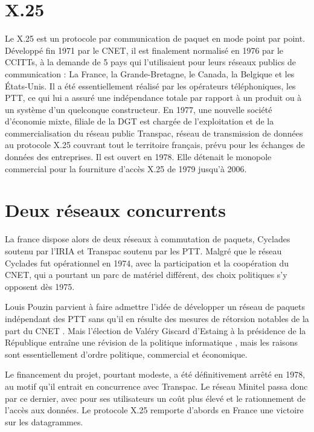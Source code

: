 \documentclass[12pt]{report}
\begin{document}
\section{X.25}

Le X.25 est un protocole par communication de paquet en mode point par point\cite{wikix25}. Développé fin 1971 par le \gls{CNET}, il est finalement normalisé en 1976 par le \glspl{CCITT}, à la demande de 5 pays qui l'utilisaient pour leurs réseaux publics de communication : La France, la Grande-Bretagne, le Canada, la Belgique et les États-Unis. Il a été essentiellement réalisé par les opérateurs téléphoniques, les \gls{PTT}, ce qui lui a assuré une indépendance totale par rapport à un produit ou à un système d'un quelconque constructeur. En 1977, une nouvelle société d'économie mixte, filiale de la DGT est chargée de l'exploitation et de la commercialisation du réseau public Transpac, réseau de transmission de données au protocole X.25 couvrant tout le territoire français, prévu pour les échanges de données des entreprises. Il est ouvert en 1978. Elle détenait le monopole commercial pour la fourniture d'accès X.25 de 1979 jusqu'à 2006\cite{wikitranspac}.

\section{Deux réseaux concurrents}

La france dispose alors de deux réseaux à commutation de paquets, Cyclades soutenu par l'IRIA et Transpac soutenu par les PTT. Malgré que le réseau Cyclades fut opérationnel en 1974, avec la participation et la coopération du CNET, qui a pourtant un parc de matériel différent, des choix politiques s'y opposent dès 1975.

Louis Pouzin parvient à faire admettre l'idée de développer un réseau de paquets indépendant des PTT \og sans qu'il en résulte des mesures de rétorsion notables de la part du CNET \fg. Mais l'élection de Valéry Giscard d'Estaing à la présidence de la République entraîne \og une révision de la politique informatique \fg, mais les raisons sont essentiellement d'ordre politique, commercial et économique.

Le financement du projet, pourtant modeste, a été définitivement arrêté en 1978, au motif qu'il entrait en concurrence avec Transpac. Le réseau Minitel passa donc par ce dernier, avec pour ses utilisateurs un coût plus élevé et le rationnement de l'accès aux données. Le protocole X.25 remporte d'abords en France une victoire sur les datagrammes.
\end{document}
